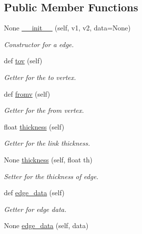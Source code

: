 \subsection*{Public Member Functions}
\begin{DoxyCompactItemize}
\item 
None \mbox{\hyperlink{classbridges_1_1edge_1_1_edge_aa08bc5f3303681a923f14fdb31e85768}{\+\_\+\+\_\+init\+\_\+\+\_\+}} (self, v1, v2, data=None)
\begin{DoxyCompactList}\small\item\em Constructor for a edge. \end{DoxyCompactList}\item 
def \mbox{\hyperlink{classbridges_1_1edge_1_1_edge_a70e81381eaa6abafd0c40962326351a9}{tov}} (self)
\begin{DoxyCompactList}\small\item\em Getter for the to vertex. \end{DoxyCompactList}\item 
def \mbox{\hyperlink{classbridges_1_1edge_1_1_edge_a63bf9365bcaa4e07d687b845b1d6f9f2}{fromv}} (self)
\begin{DoxyCompactList}\small\item\em Getter for the from vertex. \end{DoxyCompactList}\item 
float \mbox{\hyperlink{classbridges_1_1edge_1_1_edge_a0eca6eeec34108b75b7718de236dc667}{thickness}} (self)
\begin{DoxyCompactList}\small\item\em Getter for the link thickness. \end{DoxyCompactList}\item 
None \mbox{\hyperlink{classbridges_1_1edge_1_1_edge_a8a73c1e0606642be6cf0317e020eb49a}{thickness}} (self, float th)
\begin{DoxyCompactList}\small\item\em Setter for the thickness of edge. \end{DoxyCompactList}\item 
def \mbox{\hyperlink{classbridges_1_1edge_1_1_edge_abc3f52467d38ad2d7e06113d0c714ed6}{edge\+\_\+data}} (self)
\begin{DoxyCompactList}\small\item\em Getter for edge data. \end{DoxyCompactList}\item 
None \mbox{\hyperlink{classbridges_1_1edge_1_1_edge_a1ce792ec5e30535e5546eb4d354245eb}{edge\+\_\+data}} (self, data)

\end{DoxyCompactItemize}
